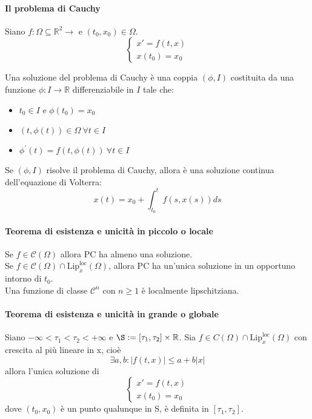 \documentclass[a4paper,12pt]{article}
\newcommand{\cont}{\mathscr{C}}
\begin{document}
\paragraph{Il problema di Cauchy}
Siano $f:\Omega \subseteq \mathbb{R}^2 \longrightarrow $ e $ \left(t_0,x_0\right) \in \Omega.$ 
$$\label{PC}\begin{cases} x'=f\left(t,x\right) \\ x\left(t_0\right)=x_0 \end{cases}$$

Una soluzione del problema di Cauchy è una coppia $\left( \phi , I \right)$ costituita da una funzione $\phi: I \longrightarrow \mathbb{R}$ differenziabile in $I$ tale che:
\begin{itemize}
\item $t_0 \in I$ e $ \phi\left(t_0\right)=x_0$
\item $ \left(t,\phi\left(t\right)\right) \in \Omega \ \forall t \in I$
\item $ \phi^{'}\left(t \right) = f\left(t,\phi\left(t\right)\right)\ \forall t \in I$
\end{itemize}

Se $\left(\phi,I\right)$ risolve il problema di Cauchy, allora è una soluzione continua dell'equazione di Volterra:
$$ x\left(t\right) = x_0 + \displaystyle\int^t_{t_0} f\left(s,x\left(s\right)\right) ds $$

\paragraph{Teorema di esistenza e unicità in piccolo o locale}
Se $f \in \cont \left(\Omega\right)$ allora PC ha almeno una soluzione. \\
Se $f \in \cont \left(\Omega\right) \cap \text{Lip}^{\text{loc}}_x\left(\Omega\right)$, allora PC ha un'unica soluzione in un opportuno intorno di $t_0$.\\
Una funzione di classe $\cont^n$ con $ n \geq 1 $ è localmente lipschitziana. 

\paragraph{Teorema di esistenza e unicità in grande o globale}
Siano $-\infty < \tau_1 < \tau_2 < +\infty$ e $\S:=\left[\tau_1,\tau_2\right]\times\mathbb{R}$. Sia $f \in C\left(\Omega\right) \cap \text{Lip}^{\text{loc}}_x\left(\Omega\right)$ con crescita al più lineare in x, cioè
$$\exists a,b: |f \left(t,x\right)|\leq a + b|x|$$
allora l'unica soluzione di 
$$\begin{cases} x'=f\left(t,x\right) \\ x\left(t_0\right)=x_0 \end{cases}$$
dove $\left(t_0,x_0\right)$ è un punto qualunque in S, è definita in $\left[\tau_1,\tau_2\right]$.
\end{document}
